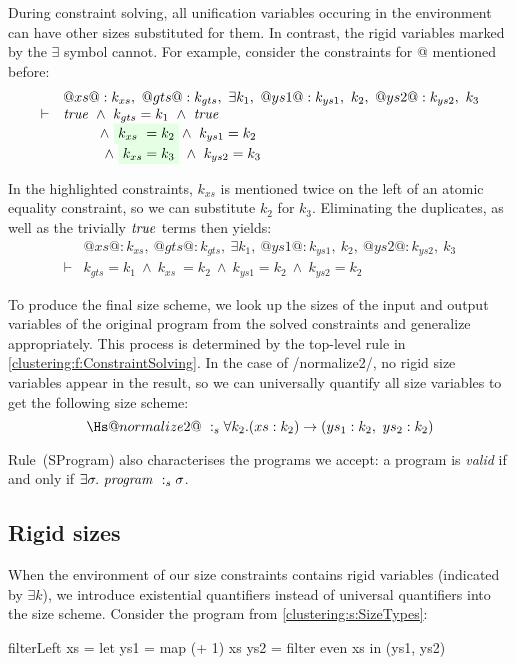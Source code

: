 During constraint solving, all unification variables occuring in the environment can have other sizes substituted for them.
In contrast, the rigid variables marked by the $\exists$ symbol cannot.
For example, consider the constraints for @ mentioned before:
$$
\begin{array}{ll}
   & @xs @ : k_{xs},~
@gts@ : k_{gts},~ \exists k_1,~
@ys1@ : k_{ys1},~ k_2,~
@ys2@ : k_{ys2},~ k_3
\\
\vdash & \true 
        ~\wedge~  k_{gts} = k_1 ~\wedge~ \true
\\     &~~~~~~~\; 
          \wedge~  \colorbox{green!10}{$k_{xs}  ~= k_2$}
          \wedge~  k_{ys1}  = k_2 
\\     &~~~~~~~\; 
        ~ \wedge~  \colorbox{green!10}{$k_{xs}   = k_3$}
        ~ \wedge~  k_{ys2}  = k_3
\end{array}
$$

In the highlighted constraints, $k_{xs}$ is mentioned twice on the left of an atomic equality constraint, so we can substitute $k_2$ for $k_3$. Eliminating the duplicates, as well as the trivially $\mathit{true}$ terms then yields:
$$
\begin{array}{ll}
   & @xs @ : k_{xs},~
@gts@ : k_{gts},~ \exists k_1,~
@ys1@ : k_{ys1},~ k_2,~
@ys2@ : k_{ys2},~ k_3
\\
\vdash & k_{gts} = k_1
        ~\wedge~  k_{xs}  ~= k_2
        ~\wedge~  k_{ys1}  = k_2 
        ~\wedge~  k_{ys2}  = k_2
\end{array}
$$

To produce the final size scheme, we look up the sizes of the input and output variables of the original program from the solved constraints and generalize appropriately.
This process is determined by the top-level rule in \cref{clustering:f:ConstraintSolving}.
In the case of \Hs/normalize2/, no rigid size variables appear in the result, so we can universally quantify all size variables to get the following size scheme:
$$\Hs@normalize2@ ~:_s \forall k_2. (xs : k_2) \to (ys_1 : k_2,~ ys_2 : k_2)
$$


Rule~(SProgram) also characterises the programs we accept: a program is \emph{valid} if and only if $\exists \sigma.\ \mathit{program} ~:_{s} \sigma$. 

\subsection{Rigid sizes}
\label{clustering:s:RigidSizes}
When the environment of our size constraints contains rigid variables (indicated by $\exists k$), we introduce existential quantifiers instead of universal quantifiers into the size scheme.
Consider the \Hs@filterLeft@ program from \cref{clustering:s:SizeTypes}:
\begin{haskell}
filterLeft xs
 = let ys1 = map (+ 1)   xs
       ys2 = filter even xs
   in (ys1, ys2)
\end{haskell}


